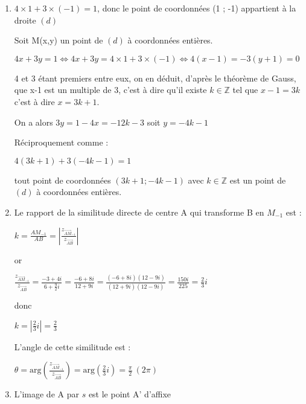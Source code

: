 \begin{corrige}
     \begin{enumerate}
          \item
          $4 \times  1+3 \times  \left(-1\right)=1$, donc le point de coordonnées (1 ; -1) appartient à la droite $\left(d\right)$
          \par
          Soit M(x,y) un point de $\left(d\right)$ à coordonnées entières.
          \par
          $4x+3y=1 \Leftrightarrow  4x+3y=4\times 1+3\times \left(-1\right) \Leftrightarrow  4\left(x-1\right)=-3\left(y+1\right)=0$
          \par
          4 et 3 étant premiers entre eux, on en déduit, d'après le théorème de Gauss,  que x-1 est un multiple de 3, c'est à dire qu'il existe $k \in \mathbb{Z}$ tel que $x-1=3k$ c'est à dire $x=3k+1$.
          \par
          On a alors $3y=1-4x=-12k-3$ soit $y=-4k-1$
          \par
          Réciproquement comme :
          \par
          $4\left(3k+1\right)+3\left(-4k-1\right)=1$
          \par
          tout point de coordonnées $\left(3k+1;-4k-1\right)$ avec $k \in \mathbb{Z}$ est un point de $\left(d\right)$ à coordonnées entières.
          \item
          Le rapport de la similitude directe de centre A qui transforme B en $M_{-1}$ est :
          \par
          $k=\frac{AM_{-1}}{AB}=|\frac{z_{\overrightarrow{AM}_{-1}}}{z_{\overrightarrow{AB}}}|$
          \par
          or
          \par
          $\frac{z_{\overrightarrow{AM}_{-1}}}{z_{\overrightarrow{AB}}}=\frac{-3+4i}{6+\frac{9}{2}i}=\frac{-6+8i}{12+9i}=\frac{\left(-6+8i\right)\left(12-9i\right)}{\left(12+9i\right)\left(12-9i\right)}=\frac{150i}{225}=\frac{2}{3}i$
          \par
          donc
          \par
          $k=|\frac{2}{3}i|=\frac{2}{3}$
          \par
          L'angle de cette similitude est :
          \par
          $\theta =\text{arg}\left(\frac{z_{\overrightarrow{AM}_{-1}}}{z_{\overrightarrow{AB}}}\right)=\text{arg}\left(\frac{2}{3}i\right)=\frac{\pi }{2}\ \left(2\pi \right)$
          \item
          L'image de A par $s$ est le point A' d'affixe

\end{enumerate}
\end{corrige}
